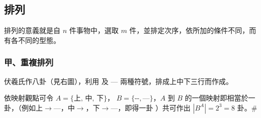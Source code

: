 \subsection{排列}\label{sec:b5s-2-2}
\setcounter{equation}{0}

排列的意義就是自 $n$ 件事物中，選取 $m$ 件，並排定次序，依所加的條件不同，而有各不同的型態。

\subsubsection*{甲、重複排列}

\noindent
\begin{minipage}[c]{0.56\textwidth}
\begin{example}\label{ex:b5s-2-7}
伏羲氏作八卦（見右圖），利用 \text{-{}-} 及 — 兩種符號，排成上中下三行而作成。

依映射觀點可令 $A = \{\text{上, 中, 下}\}$，
$B = \{\text{-{}-}, \text{—}\}$，$A$ 到 $B$ 的一個映射即相當於一卦，（例如上$\to$—，中$\to$\text{-{}-}，下$\to$—，即得一卦%
\begingroup\setlength{\fboxsep}{0pt}%
%
\endgroup%
）共可作出 $|B^A| = 2^3 = 8$ 卦。\hfill\#
\end{example}
\end{minipage}\hfill
